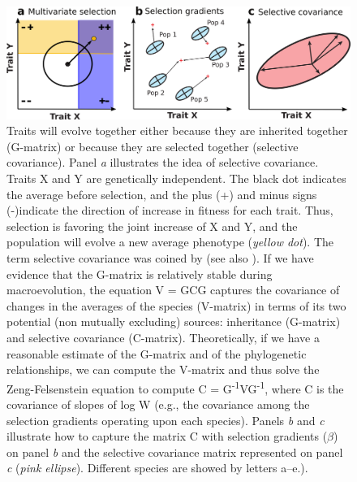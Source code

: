\begin{refsection}
\begin{figure}[ht]
\includegraphics[width=\linewidth]{chapter_annual_review/media/figure4.png}
\caption[Evolution and covariation]{Traits will evolve together
either because they are inherited together (G-matrix) or because they
are selected together (selective covariance). Panel \emph{a} illustrates
the idea of selective covariance. Traits X and Y are genetically
independent. The black dot indicates the average before selection, and
the plus (+) and minus signs (-)indicate the direction of increase in
fitness for each trait. Thus, selection is favoring the joint increase
of X and Y, and the population will evolve a new average phenotype
(\emph{yellow dot}). The term selective covariance was coined by
\textcite{Felsenstein1988-ql} (see also
\textcite{Zeng1988-or}). If we have evidence that
the G-matrix is relatively stable during macroevolution, the equation V
= GCG captures the covariance of changes in the averages of the species
(V-matrix) in terms of its two potential (non mutually excluding) sources:
inheritance (G-matrix) and selective covariance (C-matrix).
Theoretically, if we have a reasonable estimate of the G-matrix and of
the phylogenetic relationships, we can compute the V-matrix and thus
solve the Zeng-Felsenstein equation to compute C =
G\textsuperscript{-1}VG\textsuperscript{-1}, where C is the covariance
of slopes of log W (e.g., the covariance among the selection gradients
operating upon each species). Panels \emph{b} and \emph{c} illustrate
how to capture the matrix C with selection gradients ($\beta$) on panel
\emph{b} and the selective covariance matrix represented on panel
\emph{c} (\emph{pink ellipse}). Different species are showed by letters
a--e.).}
\label{aree:fig4}
\end{figure}


\end{refsection}
